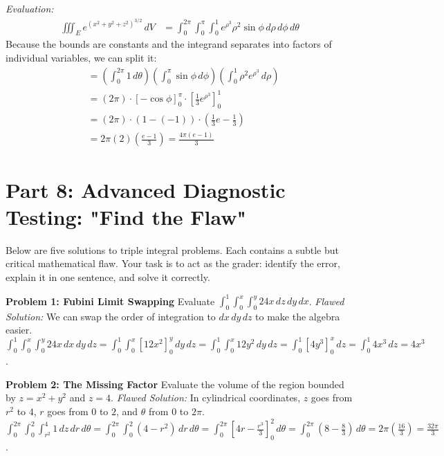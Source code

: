 \documentclass[12pt]{article}
\begin{document}
\textit{Evaluation:}
\begin{align*} 
\iiint_E e^{(x^2+y^2+z^2)^{3/2}} \, dV &= \int_{0}^{2\pi} \int_{0}^{\pi} \int_{0}^{1} e^{\rho^3} \rho^2 \sin\phi \, d\rho \, d\phi \, d\theta 
\end{align*}
Because the bounds are constants and the integrand separates into factors of individual variables, we can split it:
\begin{align*}
&= \left( \int_{0}^{2\pi} 1 \, d\theta \right) \left( \int_{0}^{\pi} \sin\phi \, d\phi \right) \left( \int_{0}^{1} \rho^2 e^{\rho^3} \, d\rho \right) \\
&= (2\pi) \cdot [-\cos\phi]_{0}^{\pi} \cdot \left[ \frac{1}{3}e^{\rho^3} \right]_{0}^{1} \\
&= (2\pi) \cdot (1 - (-1)) \cdot \left( \frac{1}{3}e - \frac{1}{3} \right) \\
&= 2\pi(2)\left(\frac{e-1}{3}\right) = \frac{4\pi(e-1)}{3}
\end{align*}

\newpage
\section{Part 8: Advanced Diagnostic Testing: "Find the Flaw"}

Below are five solutions to triple integral problems. Each contains a subtle but critical mathematical flaw. Your task is to act as the grader: identify the error, explain it in one sentence, and solve it correctly.

\vspace{0.3cm}
\textbf{Problem 1: Fubini Limit Swapping}
Evaluate $\int_{0}^{1} \int_{0}^{x} \int_{0}^{y} 24x \, dz \, dy \, dx$.
\textit{Flawed Solution:} 
We can swap the order of integration to $dx \, dy \, dz$ to make the algebra easier. 
$\int_{0}^{1} \int_{0}^{x} \int_{0}^{y} 24x \, dx \, dy \, dz = \int_{0}^{1} \int_{0}^{x} \left[ 12x^2 \right]_{0}^{y} \, dy \, dz = \int_{0}^{1} \int_{0}^{x} 12y^2 \, dy \, dz = \int_{0}^{1} \left[ 4y^3 \right]_{0}^{x} \, dz = \int_{0}^{1} 4x^3 \, dz = 4x^3$.

\textbf{Problem 2: The Missing Factor}
Evaluate the volume of the region bounded by $z = x^2 + y^2$ and $z = 4$.
\textit{Flawed Solution:} 
In cylindrical coordinates, $z$ goes from $r^2$ to $4$, $r$ goes from $0$ to $2$, and $\theta$ from $0$ to $2\pi$. 
$\int_{0}^{2\pi} \int_{0}^{2} \int_{r^2}^{4} 1 \, dz \, dr \, d\theta = \int_{0}^{2\pi} \int_{0}^{2} (4 - r^2) \, dr \, d\theta = \int_{0}^{2\pi} [4r - \frac{r^3}{3}]_{0}^{2} \, d\theta = \int_{0}^{2\pi} (8 - \frac{8}{3}) \, d\theta = 2\pi(\frac{16}{3}) = \frac{32\pi}{3}$.
\end{document}
